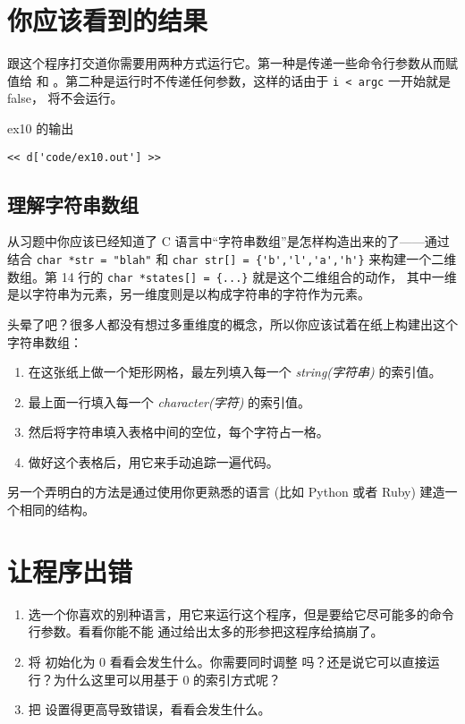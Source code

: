 \section{你应该看到的结果}

跟这个程序打交道你需要用两种方式运行它。第一种是传递一些命令行参数从而赋值给  和  。第二种是运行时不传递任何参数，这样的话由于 \verb|i < argc|
一开始就是 false， 将不会运行。

\begin{code}{ex10 的输出}
\begin{lstlisting}
<< d['code/ex10.out'] >>
\end{lstlisting}
\end{code}

\subsection{理解字符串数组}

从习题中你应该已经知道了 C 语言中“字符串数组”是怎样构造出来的了——通过结合
 \verb|char *str = "blah"| 和 \verb|char str[] = {'b','l','a','h'}| 
 来构建一个二维数组。第 14 行的 \verb|char *states[] = {...}| 就是这个二维组合的动作，
 其中一维是以字符串为元素，另一维度则是以构成字符串的字符作为元素。

头晕了吧？很多人都没有想过多重维度的概念，所以你应该试着在纸上构建出这个字符串数组：

\begin{enumerate}
\item 在这张纸上做一个矩形网格，最左列填入每一个 \emph{string(字符串)} 的索引值。
\item 最上面一行填入每一个 \emph{character(字符)} 的索引值。
\item 然后将字符串填入表格中间的空位，每个字符占一格。
\item 做好这个表格后，用它来手动追踪一遍代码。
\end{enumerate}

另一个弄明白的方法是通过使用你更熟悉的语言 (比如 Python 或者 Ruby) 建造一个相同的结构。

\section{让程序出错}

\begin{enumerate}
\item 选一个你喜欢的别种语言，用它来运行这个程序，但是要给它尽可能多的命令行参数。看看你能不能
通过给出太多的形参把这程序给搞崩了。
\item 将  初始化为 0 看看会发生什么。你需要同时调整  吗？还是说它可以直接运行？为什么这里可以用基于 0 的索引方式呢？
\item 把  设置得更高导致错误，看看会发生什么。
\end{enumerate}

